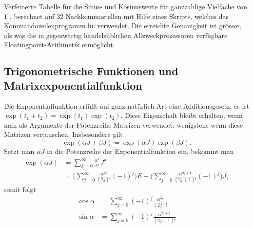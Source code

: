\begin{table}
\centering
{\small

}
\caption{Verfeinerte Tabelle für die Sinus- und Kosinuswerte für ganzzahlige
Vielfache von $1^\circ$, berechnet auf 32 Nachkommastellen mit Hilfe eines
Skripts, welches das Kommandozeilenprogramm \texttt{bc} verwendet.
Die erreichte Genauigkeit ist grösser, als was die in gegenwärtig
handelsüblichen Allzweckprozessoren verfügbare Floatingpoint-Arithmetik
ermöglicht.
\label{buch:trigo:table:sinus}}
\end{table}

%
%
\subsection{Trigonometrische Funktionen und Matrixexponentialfunktion
\label{buch:geometrie:trigo:matrixexp}}
Die Exponentialfunktion erfüllt auf ganz natürlich Art eine
Additionsgesetz, es ist $\exp(t_1+t_2)=\exp(t_1)\exp(t_2)$.
Diese Eigenschaft bleibt erhalten, wenn man als Argumente der
Potenzreihe Matrizen verwendet, wenigstens wenn diese Matrizen
vertauschen.
Insbesondere gilt
\[
\exp(\alpha J+\beta J)
=
\exp(\alpha J) \exp(\beta J).
\]
Setzt man $\alpha J$ in die Potenzreihe der Exponentialfunktion ein, 
bekommt man
\begin{align*}
\exp(\alpha J)
&=
\sum_{k=0}^\infty \frac{\alpha^k}{k!}J^k
\\
&=
\biggl(
\sum_{j=0}^\infty \frac{\alpha^{2j}}{(2j)!}(-1)^j
\biggr)E
+
\biggl(
\sum_{j=0}^\infty \frac{\alpha^{2j+1}}{(2j+1)!}(-1)^j
\biggr)J,
\end{align*}
somit folgt
\begin{align*}
\cos\alpha
&=
\sum_{j=0}^\infty (-1)^j\frac{\alpha^{2j}}{(2j)!}
\\
\sin\alpha
&=
\sum_{j=0}^\infty (-1)^j\frac{\alpha^{2j+1}}{(2j+1)!}
\end{align*}



